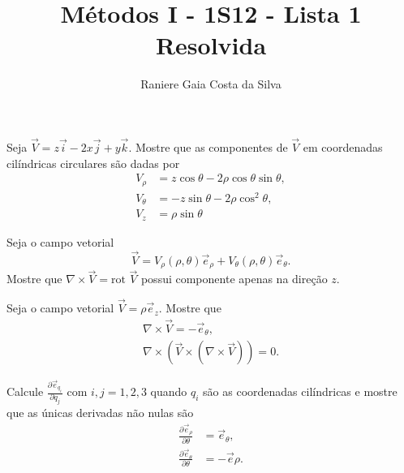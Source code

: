 \documentclass[a4paper,12pt,answers]{exam}
\newcommand{\devp}[2]{\frac{\partial #1}{\partial #2}}
\begin{document}
\title{M\'{e}todos I - 1S12 - Lista 1 Resolvida}
\author{Raniere Gaia Costa da Silva}
\maketitle
\begin{questions}
  \question Seja $\vec{V} = z\vec{i} - 2x\vec{j} + y \vec{k}$. Mostre que as componentes de $\vec{V}$ em coordenadas cil\'{i}ndricas circulares s\~{a}o dadas por
  \begin{align*}
	V_\rho &= z \cos \theta - 2 \rho \cos \theta \sin \theta, \\
	V_\theta &= -z \sin \theta - 2 \rho \cos^2 \theta, \\
	V_z &= \rho \sin \theta
  \end{align*}
  \begin{solution}
	
  \end{solution}

  \question Seja o campo vetorial
  \[
  \vec{V} = V_\rho(\rho, \theta) \vec{e}_\rho + V_\theta(\rho, \theta) \vec{e}_\theta.
  \]
  Mostre que $\nabla \times \vec{V} = \mbox{rot } \vec{V}$ possui componente apenas na dire\c{c}\~{a}o $z$.
  \begin{solution}
	
  \end{solution}

  \question Seja o campo vetorial $\vec{V} = \rho \vec{e}_z$. Mostre que
  \begin{align*}
	\nabla \times \vec{V} = -\vec{e}_\theta, \\
	\nabla \times (\vec{V} \times (\nabla \times \vec{V})) = 0.
  \end{align*}
  \begin{solution}
	
  \end{solution}

  \question Calcule $\devp{\vec{e}_{q_i}}{q_j}$ com $i,j = 1, 2, 3$ quando $q_i$ s\~{a}o as coordenadas cil\'{i}ndricas e mostre que as únicas derivadas n\~{a}o nulas s\~{a}o
  \begin{align*}
	\devp{\vec{e}_\rho}{\theta} &= \vec{e}_\theta, \\
	\devp{\vec{e}_\theta}{\theta} &= - \vec{e}\rho.
  \end{align*}
  \begin{solution}
	
  \end{solution}


\end{questions}
\end{document}

